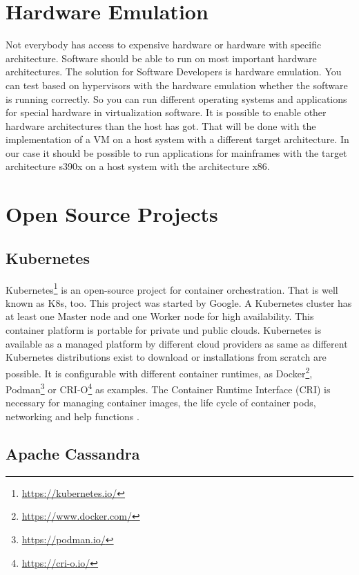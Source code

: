 \section{Hardware Emulation}

Not everybody has access to expensive hardware or hardware with  specific architecture. 
Software should be able to run on most important hardware architectures. 
The solution for Software Developers is hardware emulation. 
You can test based on hypervisors with the hardware emulation whether the software is running correctly. 
So you can run different operating systems and applications for special hardware in virtualization software. 
It is possible to enable other hardware architectures than the host has got. 
That will be done with the implementation of a VM on a host system with a different target architecture\cite[~p.3]{Rosenthal2015}. 
In our case it should be possible to run applications for mainframes with the target architecture s390x on a host system with the architecture x86.

\section{Open Source Projects}

\subsection{Kubernetes}

Kubernetes\footnote{\url{https://kubernetes.io/}} is an open-source project for container orchestration. That is well known as K8s, too. This project was started by Google. A Kubernetes cluster has at least one Master node and one Worker node for high availability. This container platform is portable for private und public clouds. Kubernetes is available as a managed platform by different cloud providers as same as different Kubernetes distributions exist to download or installations from scratch are possible. It is configurable with different container runtimes, as Docker\footnote{\url{https://www.docker.com/}}, Podman\footnote{\url{https://podman.io/}} or CRI-O\footnote{\url{https://cri-o.io/}} as examples. The Container Runtime Interface (CRI) is necessary for managing container images, the life cycle of container pods, networking and help functions \cite[~p.16]{Scholl2019}. 


\subsection{Apache Cassandra}

